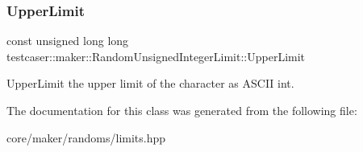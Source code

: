 \subsubsection{\texorpdfstring{UpperLimit}{UpperLimit}}
{\footnotesize\ttfamily const unsigned long long testcaser\+::maker\+::\+Random\+Unsigned\+Integer\+Limit\+::\+Upper\+Limit}



Upper\+Limit the upper limit of the character as A\+S\+C\+II int. 



The documentation for this class was generated from the following file\+:\begin{DoxyCompactItemize}
\item 
core/maker/randoms/limits.\+hpp\end{DoxyCompactItemize}
